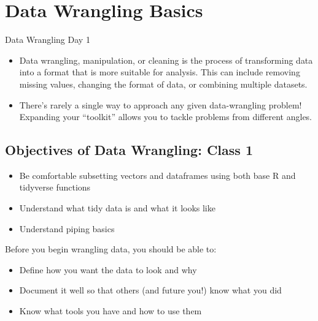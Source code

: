 \documentclass[
  letterpaper,
  DIV=11,
  numbers=noendperiod]{scrreprt}
\begin{document}
\hypertarget{data-wrangling-basics}{%
\chapter{Data Wrangling Basics}\label{data-wrangling-basics}}

Data Wrangling Day 1

\hfill\break

\begin{itemize}
\item
  Data wrangling, manipulation, or cleaning is the process of
  transforming data into a format that is more suitable for analysis.
  This can include removing missing values, changing the format of data,
  or combining multiple datasets.
\item
  There's rarely a single way to approach any given data-wrangling
  problem! Expanding your ``toolkit'' allows you to tackle problems from
  different angles.
\end{itemize}

\hypertarget{objectives-of-data-wrangling-class-1}{%
\section{Objectives of Data Wrangling: Class
1}\label{objectives-of-data-wrangling-class-1}}

\begin{itemize}
\item
  Be comfortable subsetting vectors and dataframes using both base R and
  tidyverse functions
\item
  Understand what tidy data is and what it looks like
\item
  Understand piping basics
\end{itemize}

\begin{tcolorbox}[enhanced jigsaw, left=2mm, colframe=quarto-callout-note-color-frame, leftrule=.75mm, opacitybacktitle=0.6, toptitle=1mm, title=\textcolor{quarto-callout-note-color}{\faInfo}\hspace{0.5em}{Note}, opacityback=0, coltitle=black, colbacktitle=quarto-callout-note-color!10!white, breakable, colback=white, titlerule=0mm, bottomrule=.15mm, arc=.35mm, bottomtitle=1mm, rightrule=.15mm, toprule=.15mm]

Before you begin wrangling data, you should be able to:

\begin{itemize}
\item
  Define how you want the data to look and why
\item
  Document it well so that others (and future you!) know what you did
\item
  Know what tools you have and how to use them
\end{itemize}

\end{tcolorbox}
\end{document}

